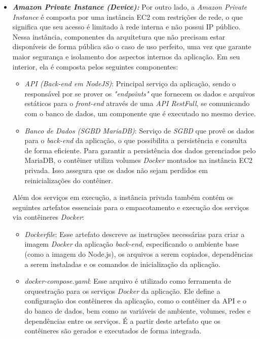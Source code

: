 \begin{itemize}
  \item \textbf{\textit{Amazon Private Instance (Device):}} Por outro lado, a \textit{Amazon Private Instance} é composta por uma instância EC2 com restrições de rede, o que significa que seu acesso é limitado à rede interna e não possui IP público. Nessa instância, componentes da arquitetura que não precisam estar disponíveis de forma pública são o caso de uso perfeito, uma vez que garante maior segurança e isolamento dos aspectos internos da aplicação. Em seu interior, ela é composta pelos seguintes componentes:
    \begin{itemize}
      \item \textit{API (Back-end em NodeJS)}: Principal serviço da aplicação, sendo o responsável por se prover os \emph{"endpoints"} que fornecem os dados e arquivos estáticos para o \textit{front-end} através de uma \textit{API RestFull}, se comunicando com o banco de dados, um componente que é executado no mesmo device.
      \item \textit{Banco de Dados (SGBD MariaDB)}: Serviço de \textit{SGBD} que provê os dados para o \textit{back-end} da aplicação, o que possibilita a persistência e consulta de forma eficiente. Para garantir a persistência dos dados gerenciados pelo MariaDB, o contêiner utiliza volumes \emph{Docker} montados na instância EC2 privada. Isso assegura que os dados não sejam perdidos em reinicializações do contêiner.
    \end{itemize}
  Além dos serviços em execução, a instância privada também contém os seguintes artefatos essenciais para o empacotamento e execução dos serviços via contêineres \emph{Docker}:
    \begin{itemize}
      \item \textit{Dockerfile}: Esse artefato descreve as instruções necessárias para criar a imagem \emph{Docker} da aplicação \textit{back-end}, especificando o ambiente base (como a imagem do Node.js), os arquivos a serem copiados, dependências a serem instaladas e os comandos de inicialização da aplicação.

      \item \textit{docker-compose.yaml}: Esse arquivo é utilizado como ferramenta de orquestração para os serviços \emph{Docker} da aplicação. Ele define a configuração dos contêineres da aplicação, como o contêiner da API e o do banco de dados, bem como as variáveis de ambiente, volumes, redes e dependências entre os serviços. É a partir deste artefato que os contêineres são gerados e executados de forma integrada.
    \end{itemize}


\end{itemize}
